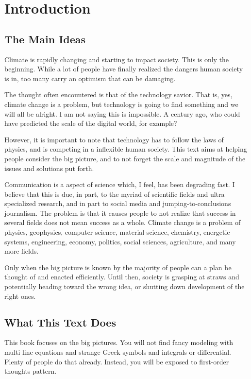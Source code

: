 \setchapterpreamble[u]{\margintoc}
\chapter{Introduction}

\section{The Main Ideas}

Climate is rapidly changing and starting to impact society. This is only the beginning. While a lot of people have finally realized the dangers human society is in, too many carry an optimism that can be damaging.

The thought often encountered is that of the technology savior. That is, yes, climate change is a problem, but technology is going to find something and we will all be alright. I am not saying this is impossible. A century ago, who could have predicted the scale of the digital world, for example?

However, it is important to note that technology has to follow the laws of physics, and is competing in a inflexible human society. This text aims at helping people consider the big picture, and to not forget the scale and magnitude of the issues and solutions put forth.

Communication is a aspect of science which, I feel, has been degrading fast. I believe that this is due, in part, to the myriad of scientific fields and ultra specialized research, and in part to social media and jumping-to-conclusions journalism. The problem is that it causes people to not realize that success in several fields does not mean success as a whole. Climate change is a problem of physics, geophysics, computer science, material science, chemistry, energetic systems, engineering, economy, politics, social sciences, agriculture, and many more fields.

Only when the big picture is known by the majority of people can a plan be thought of and enacted efficiently. Until then, society is grasping at straws and potentially heading toward the wrong idea, or shutting down development of the right ones.

\section{What This Text Does}

This book focuses on the big pictures. You will not find fancy modeling with multi-line equations and strange Greek symbols and integrals or differential. Plenty of people do that already. Instead, you will be exposed to first-order thoughts pattern.

